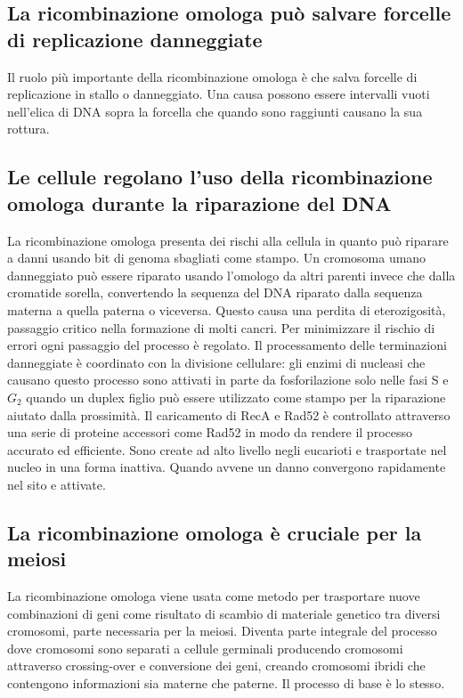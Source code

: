 \subsection{La ricombinazione omologa pu\`o salvare forcelle di replicazione danneggiate}
Il ruolo pi\`u importante della ricombinazione omologa \`e che salva forcelle di replicazione in stallo o danneggiato. Una causa possono essere intervalli vuoti nell'elica di DNA 
sopra la forcella che quando sono raggiunti causano la sua rottura. 
\subsection{Le cellule regolano l'uso della ricombinazione omologa durante la riparazione del DNA}
La ricombinazione omologa presenta dei rischi alla cellula in quanto pu\`o riparare a danni usando bit di genoma sbagliati come stampo. Un cromosoma umano danneggiato pu\`o essere 
riparato usando l'omologo da altri parenti invece che dalla cromatide sorella, convertendo la sequenza del DNA riparato dalla sequenza materna a quella paterna o viceversa. Questo causa 
una perdita di eterozigosit\`a, passaggio critico nella formazione di molti cancri. Per minimizzare il rischio di errori ogni passaggio del processo \`e regolato. Il processamento delle
terminazioni danneggiate \`e coordinato con la divisione cellulare: gli enzimi di nucleasi che causano questo processo sono attivati in parte da fosforilazione solo nelle fasi S e $G_2$
quando un duplex figlio pu\`o essere utilizzato come stampo per la riparazione aiutato dalla prossimit\`a. Il caricamento di RecA e Rad52 \`e controllato attraverso una serie di 
proteine accessori come Rad52 in modo da rendere il processo accurato ed efficiente. Sono create ad alto livello negli eucarioti e trasportate nel nucleo in una forma inattiva. Quando
avvene un danno convergono rapidamente nel sito e attivate. 
\subsection{La ricombinazione omologa \`e cruciale per la meiosi}
La ricombinazione omologa viene usata come metodo per trasportare nuove combinazioni di geni come risultato di scambio di materiale genetico tra diversi cromosomi, parte necessaria per
la meiosi. Diventa parte integrale del processo dove cromosomi sono separati a cellule germinali producendo cromosomi attraverso crossing-over e conversione dei geni, creando 
cromosomi ibridi che contengono informazioni sia materne che paterne. Il processo di base \`e lo stesso.
